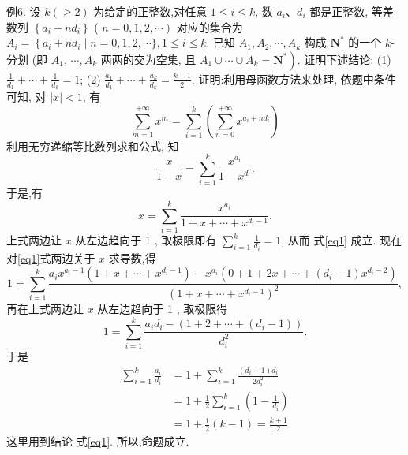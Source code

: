 例6. 设 $k(\geqslant 2)$ 为给定的正整数,对任意 $1 \leqslant i \leqslant k$, 数 $a_i 、 d_i$ 都是正整数, 等差数列 $\left\{a_i+n d_i\right\}$ ( $\left.n=0,1,2, \cdots\right)$ 对应的集合为 $A_i=\left\{a_i+n d_i \mid n=\right. 0,1,2, \cdots\}, 1 \leqslant i \leqslant k$. 已知 $A_1, A_2, \cdots, A_k$ 构成 $\mathbf{N}^*$ 的一个 $k$-分划 (即 $A_1$, $\cdots, A_k$ 两两的交为空集, 且 $\left.A_1 \cup \cdots \cup A_k=\mathbf{N}^*\right)$. 证明下述结论:
(1) $\frac{1}{d_1}+\cdots+\frac{1}{d_k}=1$;
(2) $\frac{a_1}{d_1}+\cdots+\frac{a_k}{d_k}=\frac{k+1}{2}$.
证明:利用母函数方法来处理, 依题中条件可知, 对 $|x|<1$, 有
$$
\sum_{m=1}^{+\infty} x^m=\sum_{i=1}^k\left(\sum_{n=0}^{+\infty} x^{a_i+n d_i}\right)
$$
利用无穷递缩等比数列求和公式, 知
$$
\frac{x}{1-x}=\sum_{i=1}^k \frac{x^{a_i}}{1-x^{d_i}} .
$$
于是,有
$$
x=\sum_{i=1}^k \frac{x^{a_i}}{1+x+\cdots+x^{d_i-1}} . \label{eq1}
$$
上式两边让 $x$ 从左边趋向于 1 , 取极限即有 $\sum_{i=1}^k \frac{1}{d_i}=1$, 从而 式\ref{eq1} 成立.
现在对\ref{eq1}式两边关于 $x$ 求导数,得
$$
1=\sum_{i=1}^k \frac{a_i x^{a_i-1}\left(1+x+\cdots+x^{d_i-1}\right)-x^{a_i}\left(0+1+2 x+\cdots+\left(d_i-1\right) x^{d_i-2}\right)}{\left(1+x+\cdots+x^{d_i-1}\right)^2},
$$
再在上式两边让 $x$ 从左边趋向于 1 , 取极限得
$$
1=\sum_{i=1}^k \frac{a_i d_i-\left(1+2+\cdots+\left(d_i-1\right)\right)}{d_i^2} .
$$
于是
$$
\begin{aligned}
\sum_{i=1}^k \frac{a_i}{d_i} & =1+\sum_{i=1}^k \frac{\left(d_i-1\right) d_i}{2 d_i^2} \\
& =1+\frac{1}{2} \sum_{i=1}^k\left(1-\frac{1}{d_i}\right) \\
& =1+\frac{1}{2}(k-1)=\frac{k+1}{2}
\end{aligned}
$$
这里用到结论 式\ref{eq1}.
所以,命题成立.


